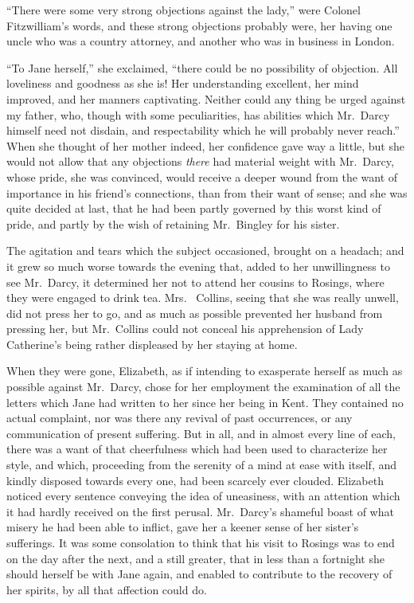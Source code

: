 “There were some very strong objections ag\-ainst the
lady,” were Colonel Fitzwilliam’s words, and these strong
objections probably were, her having one uncle who was
a country attorney, and another who was in business in
London.

“To Jane herself,” she exclaimed, “there could be no
possibility of objection. All loveliness and goodness as
she is! Her understanding excellent, her mind improved,
and her manners captivating. Neither could any thing
be urged against my father, who, though with some
peculiarities, has abilities which Mr.\ Darcy himself need
not disdain, and respectability which he will probably
never reach.” When she thought of her mother indeed,
her confidence gave way a little, but she would not allow
that any objections \textit{there} had material weight with
Mr.\ Darcy, whose pride, she was convinced, would receive
a deeper wound from the want of importance in his friend’s
connections, than from their want of sense; and she was
quite decided at last, that he had been partly governed
by this worst kind of pride, and partly by the wish of
retaining Mr.\ Bingley for his sister.

The agitation and tears which the subject occasioned,
brought on a headach; and it grew so much worse
towards the evening that, added to her unwillingness to
see Mr.\ Darcy, it determined her not to attend her cousins
to Rosings, where they were engaged to drink tea. Mrs.\ %
Collins, seeing that she was really unwell, did not press
her to go, and as much as possible prevented her husband
from pressing her, but Mr.\ Collins could not conceal his
apprehension of Lady Catherine’s being rather displeased
by her staying at home.


When they were gone, Elizabeth, as if intending to
exasperate herself as much as possible against Mr.\ Darcy,
chose for her employment the examination of all the letters
which Jane had written to her since her being in Kent.
They contained no actual complaint, nor was there any
revival of past occurrences, or any communication of
present suffering. But in all, and in almost every line of
each, there was a want of that cheerfulness which had
been used to characterize her style, and which, proceeding
from the serenity of a mind at ease with itself, and kindly
disposed towards every one, had been scarcely ever clouded.
Elizabeth noticed every sentence conveying the idea of
uneasiness, with an attention which it had hardly received
on the first perusal. Mr.\ Darcy’s shameful boast of what
misery he had been able to inflict, gave her a keener sense
of her sister’s sufferings. It was some consolation to
think that his visit to Rosings was to end on the day after
the next, and a still greater, that in less than a fortnight
she should herself be with Jane again, and enabled to
contribute to the recovery of her spirits, by all that
affection could do.

